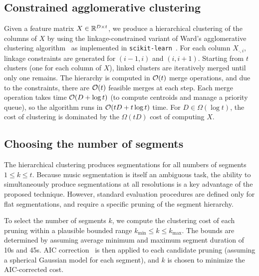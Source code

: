 \documentclass{article}
\begin{document}
\subsection{Constrained agglomerative clustering}
\label{sec:clustering}
Given a feature matrix $X \in \mathbb{R}^{D\times t}$, we produce a hierarchical clustering of the columns of $X$ by using the
linkage-constrained variant of Ward's agglomerative clustering algorithm~\cite{ward1963hierarchical} as implemented in
\texttt{scikit-learn}~\cite{pedregosa2011scikit}.  For each column $X_{\cdot,i}$, linkage constraints are generated
for $(i-1, i)$ and $(i, i+1)$.  Starting from $t$ clusters (one for each column of $X$), 
linked clusters are iteratively merged until only one remains.
The hierarchy is computed in $\mathcal{O}(t)$ merge operations, and due to the constraints, 
there are $\mathcal{O}(t)$ feasible merges at each step. 
Each merge operation takes time $\mathcal{O}(D + \log t)$ (to compute centroids and manage a priority queue), so the algorithm runs in $\mathcal{O}(tD + t\log t)$ time.
For $D \in \Omega(\log t)$, the cost of clustering is dominated by the $\Omega(tD)$ cost of computing $X$.

\subsection{Choosing the number of segments}
The hierarchical clustering produces segmentations for all numbers of segments $1 \leq k \leq t$.  
Because music segmentation is itself an ambiguous task, the ability to simultaneously produce segmentations at all resolutions is a key advantage of the 
proposed technique.  
However, standard evaluation procedures are defined only for flat segmentations, and require a specific pruning of the segment hierarchy.

To select the number of segments $k$, we compute the clustering cost of each pruning within a plausible bounded range 
$k_{\min} \leq k \leq k_{\max}$.  The bounds are determined by assuming average minimum and maximum segment duration 
of 10s and 45s.  AIC correction~\cite{akaike1973information} is then applied to each candidate pruning (assuming a spherical 
Gaussian model for each segment), and $k$ is chosen to minimize the AIC-corrected cost.
\end{document}
